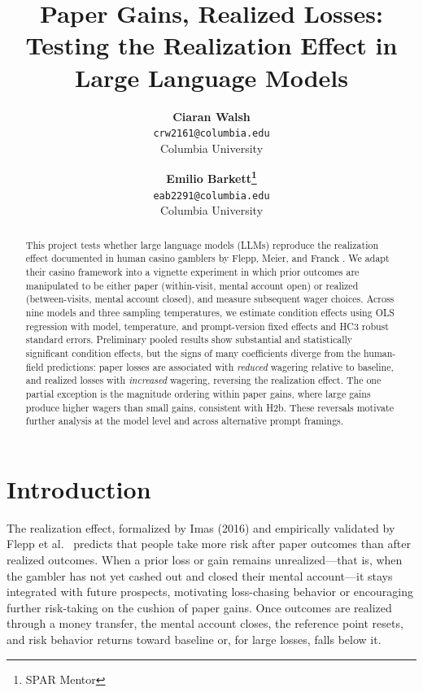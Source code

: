\documentclass[midterm]{sparreport}
\title{Paper Gains, Realized Losses: Testing the Realization Effect in Large Language Models}
\author{
  \textbf{Ciaran Walsh}\\
  \texttt{crw2161@columbia.edu} \\
  Columbia University
  \and
  \textbf{Emilio Barkett\footnote{SPAR Mentor}}\\
  \texttt{eab2291@columbia.edu}\\
  Columbia University
}
\begin{document}
\maketitle

\begin{abstract}
This project tests whether large language models (LLMs) reproduce the realization
effect documented in human casino gamblers by Flepp, Meier, and Franck \cite{flepp-2021-effect}.
We adapt their casino framework into a vignette experiment in which prior outcomes
are manipulated to be either paper (within-visit, mental account open) or realized
(between-visits, mental account closed), and measure subsequent wager choices.
Across nine models and three sampling temperatures, we estimate condition effects
using OLS regression with model, temperature, and prompt-version fixed effects and
HC3 robust standard errors. Preliminary pooled results show substantial and
statistically significant condition effects, but the signs of many coefficients
diverge from the human-field predictions: paper losses are associated with
\emph{reduced} wagering relative to baseline, and realized losses with
\emph{increased} wagering, reversing the realization effect. The one partial
exception is the magnitude ordering within paper gains, where large gains produce
higher wagers than small gains, consistent with H2b. These reversals motivate
further analysis at the model level and across alternative prompt framings.
\end{abstract}


\section{Introduction}

The realization effect, formalized by Imas (2016) and empirically validated by
Flepp et al.\ \cite{flepp-2021-effect} predicts that people take more risk after paper outcomes than
after realized outcomes. When a prior loss or gain remains unrealized---that is,
when the gambler has not yet cashed out and closed their mental account---it stays
integrated with future prospects, motivating loss-chasing behavior or encouraging
further risk-taking on the cushion of paper gains. Once outcomes are realized
through a money transfer, the mental account closes, the reference point resets,
and risk behavior returns toward baseline or, for large losses, falls below it.
\end{document}
